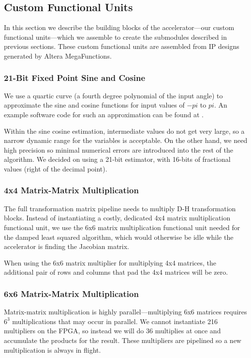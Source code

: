 \subsection{Custom Functional Units}
In this section we describe the building blocks of the accelerator---our custom functional units---which we assemble to create the submodules described in previous sections. These custom functional units are assembled from IP designs generated by Altera MegaFunctions.

\subsubsection{21-Bit Fixed Point Sine and Cosine}
We use a quartic curve (a fourth degree polynomial of the input angle) to approximate the sine and cosine functions for input values of $-pi$ to $pi$. An example software code for such an approximation can be found at \cite{sincos}. 

Within the sine cosine estimation, intermediate values do not get very large, so a narrow dynamic range for the variables is acceptable. On the other hand, we need high precision so minimal numerical errors are introduced into the rest of the algorithm. We decided on using a 21-bit estimator, with 16-bits of fractional values (right of the decimal point).

\subsubsection{4x4 Matrix-Matrix Multiplication}
The full transformation matrix pipeline needs to multiply D-H transformation blocks. Instead of instantiating a costly, dedicated 4x4 matrix multiplication functional unit, we use the 6x6 matrix multiplication functional unit needed for the damped least squared algorithm, which would otherwise be idle while the accelerator is finding the Jacobian matrix.

When using the 6x6 matrix multiplier for multiplying 4x4 matrices, the additional pair of rows and columns that pad the 4x4 matrices will be zero.

\subsubsection{6x6 Matrix-Matrix Multiplication}
Matrix-matrix multiplication is highly parallel---multiplying 6x6 matrices requires $6^3$ multiplications that may occur in parallel. We cannot instantiate 216 multipliers on the FPGA, so instead we will do 36 multiplies at once and accumulate the products for the result. These multipliers are pipelined so a new multiplication is always in flight.


